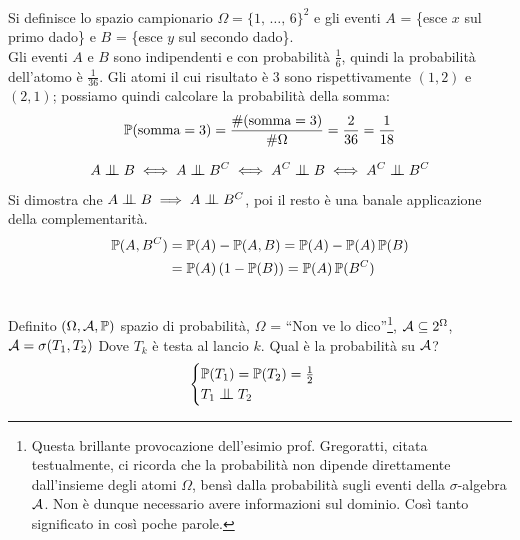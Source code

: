 \medskip
\begin{ese} \ \\
  Si definisce lo spazio campionario $\Omega = \{1, \, \dots, \, 6\}^2$ e gli eventi $A$ = \{esce $x$ sul primo dado\} e $B$ = \{esce $y$ sul secondo dado\}. \\
  Gli eventi $A$ e $B$ sono indipendenti e con probabilità $\frac{1}{6}$, quindi la probabilità dell'atomo è $\frac{1}{36}$. Gli atomi il cui risultato è $3$ sono rispettivamente $(1,2)$ e $(2,1)$; possiamo quindi calcolare la probabilità della somma:
  $$\mathbb P(\text{somma} = 3) = \frac{\#(\text{somma} = 3)}{\#\Omega} = \frac{2}{36} = \frac{1}{18}$$
\end{ese}

\medskip
\begin{teo}
  $$A \indep B \iff A \indep B^C \iff A^C \indep B \iff A^C \indep B^C$$
\end{teo}
\begin{dimo}\belowdisplayskip=-13pt
  Si dimostra che $A \indep B \implies A \indep B^C$, poi il resto è una banale applicazione della complementarità.
  \begin{align*}
    \mathbb P(A, B^C) &= \mathbb P(A) - \mathbb P(A, B) = \mathbb P(A) - \mathbb P(A)\,\mathbb P(B)\\
    &=\mathbb P(A)\,(1-\mathbb P(B)) = \mathbb P(A)\, \mathbb P(B^C)
  \end{align*}
  \qedhere
\end{dimo}

\medskip
\begin{ese} \ \\
  Definito $(\Omega, \mathcal A, \mathbb P)$ spazio di probabilità, $\Omega$ = ``Non ve lo dico''\footnote{Questa brillante provocazione dell'esimio prof. Gregoratti, citata testualmente, ci ricorda che la probabilità non dipende direttamente dall'insieme degli atomi $\Omega$, bensì dalla probabilità sugli eventi della $\sigma$-algebra $\mathcal A$.
  Non è dunque necessario avere informazioni sul dominio.
  Così tanto significato in così poche parole.},
  $\mathcal A \subseteq 2^\Omega$, $\mathcal A = \sigma(T_1, T_2)$ Dove $T_k$ è testa al lancio $k$.
  Qual è la probabilità su $\mathcal A$?
  $$\begin{cases}\PP(T_1) = \PP(T_2) = \frac{1}{2} \\ T_1 \indep T_2 \end{cases}$$
\end{ese}

